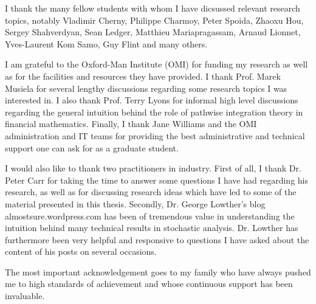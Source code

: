 \documentclass[11pt]{article}
\begin{document}
I thank the many fellow students with whom I have dicsussed relevant research topics, notably Vladimir Cherny, Philippe Charmoy, Peter Spoida, Zhaoxu Hou, Sergey Shahverdyan, Sean Ledger, Matthieu Mariapragassam, Arnaud Lionnet, Yves-Laurent Kom Samo, Guy Flint and many others.

I am grateful to the Oxford-Man Institute (OMI) for funding my research as well as for the facilities and resources they have provided. I thank Prof. Marek Musiela for several lengthy discussions regarding some research topics I was interested in. I also thank Prof. Terry Lyons for informal high level discussions regarding the general intuition behind the role of pathwise integration theory in financial mathematics. Finally, I thank Jane Williams and the OMI administration and IT teams for providing the best administrative and technical support one can ask for as a graduate student.

I would also like to thank two practitioners in industry. First of all, I thank Dr. Peter Carr for taking the time to answer some questions I have had regarding his research, as well as for discussing research ideas which have led to some of the material presented in this thesis. Secondly, Dr. George Lowther's blog almostsure.wordpress.com has been of tremendous value in understanding the intuition behind many technical results in stochastic analysis. Dr. Lowther has furthermore been very helpful and responsive to questions I have asked about the content of his posts on several occasions.

The most important acknowledgement goes to my family who have always pushed me to high standards of achievement and whose continuous support has been invaluable.



\end{document}
